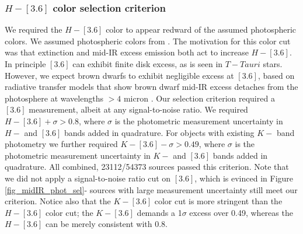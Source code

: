 \subsubsection{$H-[3.6]$ color selection criterion}
We required the $H-[3.6]$ color to appear redward of the assumed photospheric colors.  We assumed photospheric colors from \citet{2006ApJ...651..502P}.  The motivation for this color cut was that extinction and mid-IR excess emission both act to increase $H-[3.6]$.  In principle $[3.6]$ can exhibit finite disk excess, as is seen in $T-Tauri$ stars.  However, we expect brown dwarfs to exhibit negligible excess at $[3.6]$, based on radiative transfer models that show brown dwarf mid-IR excess detaches from the photosphere at wavelengths $>4$ micron \citep{2009MNRAS.394L.141E}.  Our selection criterion required a $[3.6]$ measurement, albeit at any signal-to-noise ratio.  We required $H-[3.6] + \sigma > 0.8$, where $\sigma$ is the photometric measurement uncertainty in $H-$ and $[3.6]$ bands added in quadrature.  For objects with existing $K-$ band photometry we further required $K-[3.6] - \sigma > 0.49$, where $\sigma$ is the photometric measurement uncertainty in $K-$ and $[3.6]$ bands added in quadrature.  All combined, 23112/54373 sources passed this criterion.  Note that we did not apply a signal-to-noise ratio cut on $[3.6]$, which is evinced in Figure \ref{fig_midIR_phot_sel}- sources with large measurement uncertainty still meet our criterion.  Notice also that the $K-[3.6]$ color cut is more stringent than the $H-[3.6]$ color cut; the $K-[3.6]$ demands a 1$\sigma$ excess over 0.49, whereas the $H-[3.6]$ can be merely consistent with 0.8.

